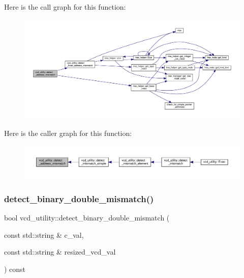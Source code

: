Here is the call graph for this function\+:
\nopagebreak
\begin{figure}[H]
\begin{center}
\leavevmode
\includegraphics[width=350pt]{d8/d51/classvcd__utility_a97b5e66d24f1509be52266177627c391_cgraph}
\end{center}
\end{figure}
Here is the caller graph for this function\+:
\nopagebreak
\begin{figure}[H]
\begin{center}
\leavevmode
\includegraphics[width=350pt]{d8/d51/classvcd__utility_a97b5e66d24f1509be52266177627c391_icgraph}
\end{center}
\end{figure}
\mbox{\label{classvcd__utility_adb80e05f3d7c891116d8be21c21c84db}} 
\subsubsection{\texorpdfstring{detect\+\_\+binary\+\_\+double\+\_\+mismatch()}{detect\_binary\_double\_mismatch()}}
{\footnotesize\ttfamily bool vcd\+\_\+utility\+::detect\+\_\+binary\+\_\+double\+\_\+mismatch (\begin{DoxyParamCaption}\item[{const std\+::string \&}]{c\+\_\+val,  }\item[{const std\+::string \&}]{resized\+\_\+vcd\+\_\+val }\end{DoxyParamCaption}) const\hspace{0.3cm}{\ttfamily [protected]}}



